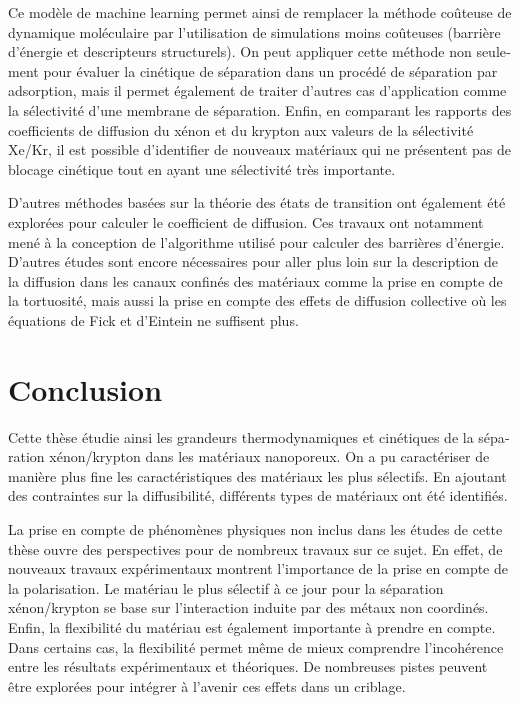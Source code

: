 \documentclass[thesis]{subfiles}
\begin{document}
\begin{otherlanguage}{french}
Ce modèle de machine learning permet ainsi de remplacer la méthode coûteuse de dynamique moléculaire par l'utilisation de simulations moins coûteuses (barrière d'énergie et descripteurs structurels). On peut appliquer cette méthode non seulement pour évaluer la cinétique de séparation dans un procédé de séparation par adsorption, mais il permet également de traiter d'autres cas d'application comme la sélectivité d'une membrane de séparation. Enfin, en comparant les rapports des coefficients de diffusion du xénon et du krypton aux valeurs de la sélectivité Xe/Kr, il est possible d'identifier de nouveaux matériaux qui ne présentent pas de blocage cinétique tout en ayant une sélectivité très importante.

D'autres méthodes basées sur la théorie des états de transition ont également été explorées pour calculer le coefficient de diffusion. Ces travaux ont notamment mené à la conception de l'algorithme utilisé pour calculer des barrières d'énergie. D'autres études sont encore nécessaires pour aller plus loin sur la description de la diffusion dans les canaux confinés des matériaux comme la prise en compte de la tortuosité, mais aussi la prise en compte des effets de diffusion collective où les équations de Fick et d'Eintein ne suffisent plus. 

\clearpage
\section*{Conclusion}

Cette thèse étudie ainsi les grandeurs thermodynamiques et cinétiques de la séparation xénon/krypton dans les matériaux nanoporeux. On a pu caractériser de manière plus fine les caractéristiques des matériaux les plus sélectifs. En ajoutant des contraintes sur la diffusibilité, différents types de matériaux ont été identifiés. 

La prise en compte de phénomènes physiques non inclus dans les études de cette thèse ouvre des perspectives pour de nombreux travaux sur ce sujet. En effet, de nouveaux travaux expérimentaux montrent l'importance de la prise en compte de la polarisation. Le matériau le plus sélectif à ce jour pour la séparation xénon/krypton se base sur l'interaction induite par des métaux non coordinés.\autocite{Pei_2022} Enfin, la flexibilité du matériau est également importante à prendre en compte. Dans certains cas, la flexibilité permet même de mieux comprendre l'incohérence entre les résultats expérimentaux et théoriques. De nombreuses pistes peuvent être explorées pour intégrer à l'avenir ces effets dans un criblage.\autocite{Lachet_1998,Witman_2017}

\vfill
\begin{center}
\end{center}
\vfill\vfill

\end{otherlanguage}

\OnlyInSubfile{\printglobalbibliography}
\end{document}
